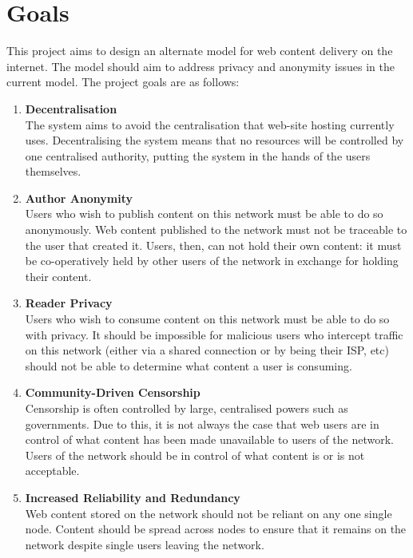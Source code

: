 \section{Goals}

This project aims to design an alternate model for web content delivery on the internet.
The model should aim to address privacy and anonymity issues in the current model.
The project goals are as follows:

\begin{enumerate}

    \item{\textbf{Decentralisation} \\
The system aims to avoid the centralisation that web-site hosting currently uses.
Decentralising the system means that no resources will be controlled by one centralised
authority, putting the system in the hands of the users themselves.
        }

    \item{\textbf{Author Anonymity} \\
Users who wish to publish content on this network must be able to do so anonymously.
Web content published to the network must not be traceable to the user that created it.
Users, then, can not hold their own content: it must be co-operatively held by other
users of the network in exchange for holding their content.
        }

    \item{\textbf{Reader Privacy} \\
Users who wish to consume content on this network must be able to do so with privacy.
It should be impossible for malicious users who intercept traffic on this network
(either via a shared connection or by being their ISP,  etc) should not be able to
determine what content a user is consuming.
        }

    \item{\textbf{Community-Driven Censorship} \\
Censorship is often controlled by large, centralised powers such as governments.
Due to this, it is not always the case that web users are in control of what content
has been made unavailable to users of the network. Users of the network should be
in control of what content is or is not acceptable.
        }

    \item{\textbf{Increased Reliability and Redundancy} \\
Web content stored on the network should not be reliant on any one single node.
Content should be spread across nodes to ensure that it remains on the network despite
single users leaving the network.
        }


\end{enumerate}
